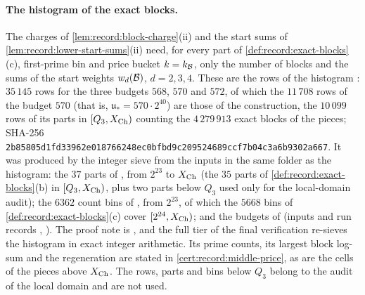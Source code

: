 \paragraph{The histogram of the exact blocks.}
The charges of \cref{lem:record:block-charge}(ii) and the start sums of
\cref{lem:record:lower-start-sums}(ii) need, for every part of
\cref{def:record:exact-blocks}(c), first-prime bin and price bucket
$k=k_{\mathcal B}$, only the number of blocks and the sums of the start weights
$w_d(\mathcal B)$, $d=2,3,4$. These are the rows of the histogram
:
$35\,145$ rows for the three budgets $568$, $570$ and $572$, of which the
$11\,708$ rows of the budget $570$ (that is, $\mathfrak u_*=570\cdot2^{40}$) are
those of the construction, the $10\,099$ rows of its parts in $[Q_3,X_{\rm Ch})$
counting the $4\,279\,913$ exact blocks of the pieces; SHA-256
\texttt{2b85805d1fd33962e018766248ec0bfb}\allowbreak\texttt{d9c209524689ccf7b04c3a6b9302a667}.
It was produced by the integer sieve
 from the
inputs in the same folder as the histogram: the $37$ parts of
, from $2^{23}$ to $X_{\rm Ch}$ (the
$35$ parts of \cref{def:record:exact-blocks}(b) in $[Q_3,X_{\rm Ch})$,
plus two parts below $Q_3$ used only for the local-domain audit); the $6362$ count bins
of , from $2^{23}$, of which the $5668$ bins of
\cref{def:record:exact-blocks}(c) cover $[2^{24},X_{\rm Ch})$; and the budgets of
 (inputs and run records
, ). The proof note is
, and the
full tier of the final verification re-sieves the histogram in exact integer
arithmetic. Its prime counts, its largest block log-sum and the regeneration are
stated in \cref{cert:record:middle-price}, as are the cells of the pieces above
$X_{\rm Ch}$. The rows, parts and bins below $Q_3$ belong to the audit of the
local domain and are not used.

